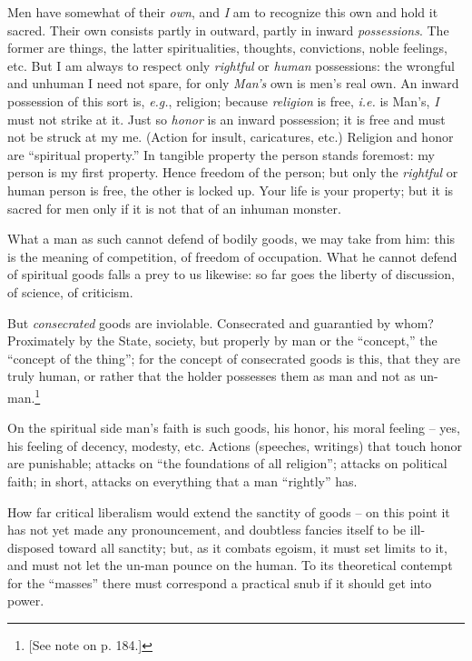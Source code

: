 Men have somewhat of their \textit{own}, and \textit{I} am to recognize this 
own and hold it sacred. Their own consists partly in outward, partly in inward 
\textit{possessions}. The former are things, the latter spiritualities, 
thoughts, convictions, noble feelings, etc. But I am always to respect only 
\textit{rightful} or \textit{human} possessions: the wrongful and unhuman I 
need not spare, for only \textit{Man's} own is men's real own. An inward 
possession of this sort is, \textit{e.g.}, religion; because 
\textit{religion} is free, \textit{i.e.} is Man's, \textit{I} must not strike 
at it. Just so \textit{honor} is an inward possession; it is free and must not 
be struck at my me. (Action for insult, caricatures, etc.) Religion and honor 
are ``spiritual property.'' In tangible property the person stands foremost: 
my person is my first property. Hence freedom of the person; but only the 
\textit{rightful} or human person is free, the other is locked up. Your life 
is your property; but it is sacred for men only if it is not that of an 
inhuman monster.

What a man as such cannot defend of bodily goods, we may take from him: this 
is the meaning of competition, of freedom of occupation. What he cannot defend 
of spiritual goods falls a prey to us likewise: so far goes the liberty of 
discussion, of science, of criticism.

But \textit{consecrated} goods are inviolable. Consecrated and guarantied by 
whom? Proximately by the State, society, but properly by man or the 
``concept,'' the ``concept of the thing''; for the concept of consecrated 
goods is this, that they are truly human, or rather that the holder possesses 
them as man and not as un-man.\footnote{[See note on p. 184.]}

On the spiritual side man's faith is such goods, his honor, his moral feeling  -- yes, his feeling of decency, modesty, etc. Actions (speeches, writings) 
that touch honor are punishable; attacks on ``the foundations of all 
religion''; attacks on political faith; in short, attacks on everything that 
a man ``rightly'' has.

How far critical liberalism would extend the sanctity of goods -- on this 
point it has not yet made any pronouncement, and doubtless fancies itself to 
be ill-disposed toward all sanctity; but, as it combats egoism, it must set 
limits to it, and must not let the un-man pounce on the human. To its 
theoretical contempt for the ``masses'' there must correspond a practical 
snub if it should get into power.

